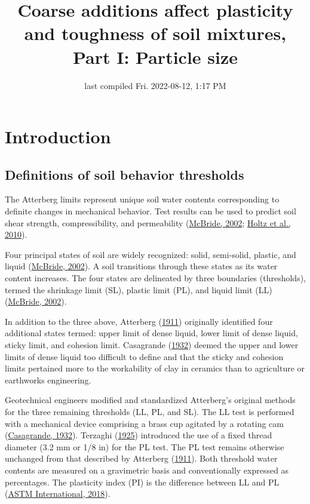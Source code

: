 \documentclass[
  letterpaper,
]{article}
\title{Coarse additions affect plasticity and toughness of soil mixtures, Part I: Particle size}
\author{}
\date{\vspace{-2.5em}last compiled Fri. 2022-08-12, 1:17 PM}
\begin{document}
\maketitle

{
\hypersetup{linkcolor=blue}
\setcounter{tocdepth}{2}
\tableofcontents
}
\linenumbers

\hypertarget{introduction}{%
\section{Introduction}\label{introduction}}

\hypertarget{definitions-of-soil-behavior-thresholds}{%
\subsection{Definitions of soil behavior thresholds}\label{definitions-of-soil-behavior-thresholds}}

The Atterberg limits represent unique soil water contents corresponding to definite changes in mechanical behavior.
Test results can be used to predict soil shear strength, compressibility, and permeability (\protect\hyperlink{ref-McBride2002}{McBride, 2002}; \protect\hyperlink{ref-Holtz2010}{Holtz et al., 2010}).

Four principal states of soil are widely recognized: solid, semi-solid, plastic, and liquid (\protect\hyperlink{ref-McBride2002}{McBride, 2002}).
A soil transitions through these states as its water content increases.
The four states are delineated by three boundaries (thresholds), termed the shrinkage limit (SL), plastic limit (PL), and liquid limit (LL) (\protect\hyperlink{ref-McBride2002}{McBride, 2002}).

In addition to the three above, Atterberg (\protect\hyperlink{ref-Atterberg1911}{1911}) originally identified four additional states termed: upper limit of dense liquid, lower limit of dense liquid, sticky limit, and cohesion limit.
Casagrande (\protect\hyperlink{ref-Casagrande1932}{1932}) deemed the upper and lower limits of dense liquid too difficult to define and that the sticky and cohesion limits pertained more to the workability of clay in ceramics than to agriculture or earthworks engineering.

Geotechnical engineers modified and standardized Atterberg's original methods for the three remaining thresholds (LL, PL, and SL).
The LL test is performed with a mechanical device comprising a brass cup agitated by a rotating cam (\protect\hyperlink{ref-Casagrande1932}{Casagrande, 1932}).
Terzaghi (\protect\hyperlink{ref-Terzaghi1925}{1925}) introduced the use of a fixed thread diameter (3.2 mm or 1/8 in) for the PL test.
The PL test remains otherwise unchanged from that described by Atterberg (\protect\hyperlink{ref-Atterberg1911}{1911}).
Both threshold water contents are measured on a gravimetric basis and conventionally expressed as percentages.
The plasticity index (PI) is the difference between LL and PL (\protect\hyperlink{ref-ASTMD43182018}{ASTM International, 2018}).
\end{document}
